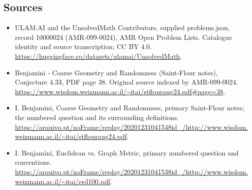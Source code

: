 \documentclass[11pt,a4paper]{article}
\begin{document}
\subsection{Sources}
\begin{itemize}
\item[S1] ULAM.AI and the UnsolvedMath Contributors, supplied problems.json, record 10000024 (AMR-099-0024), AMR Open Problem Lists. Catalogue identity and source transcription; CC BY 4.0.
\url{https://huggingface.co/datasets/ulamai/UnsolvedMath}.
\item[S2] Benjamini - Coarse Geometry and Randomness (Saint-Flour notes), Conjecture 4.33, PDF page 38. Original source indexed by AMR-099-0024.
\url{https://www.wisdom.weizmann.ac.il/~itai/stflouraug24.pdf#page=38}.
\item[S3] I. Benjamini, Coarse Geometry and Randomness, primary Saint-Flour notes; the numbered question and its surrounding definitions.
\url{https://arquivo.pt/noFrame/replay/20201231041548id_/http://www.wisdom.weizmann.ac.il/~itai/stflouraug24.pdf}.
\item[S4] I. Benjamini, Euclidean vs. Graph Metric, primary numbered question and conventions.
\url{https://arquivo.pt/noFrame/replay/20201231041538id_/http://www.wisdom.weizmann.ac.il/~itai/erd100.pdf}.
\end{itemize}
\end{document}
